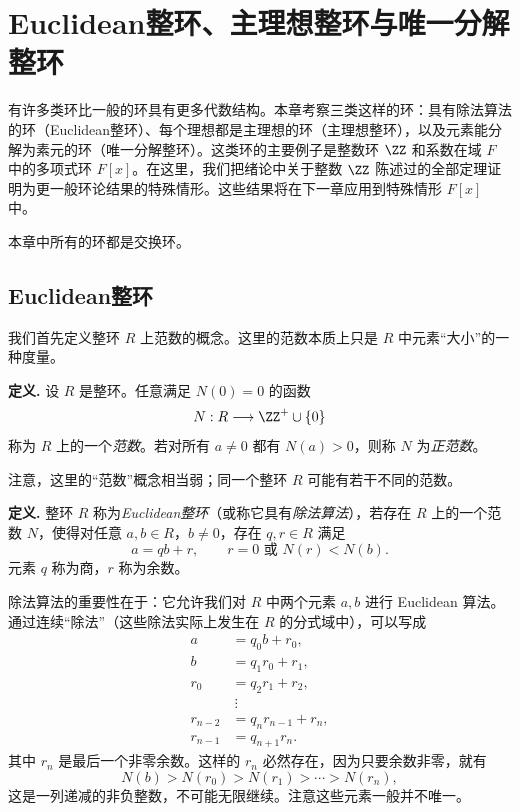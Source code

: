\chapter{Euclidean整环、主理想整环与唯一分解整环}

有许多类环比一般的环具有更多代数结构。本章考察三类这样的环：具有除法算法的环（Euclidean整环）、每个理想都是主理想的环（主理想整环），以及元素能分解为素元的环（唯一分解整环）。这类环的主要例子是整数环 $\ZZ$ 和系数在域 $F$ 中的多项式环 $F[x]$。在这里，我们把绪论中关于整数 $\ZZ$ 陈述过的全部定理证明为更一般环论结果的特殊情形。这些结果将在下一章应用到特殊情形 $F[x]$ 中。

本章中所有的环都是交换环。

\section{Euclidean整环}

我们首先定义整环 $R$ 上范数的概念。这里的范数本质上只是 $R$ 中元素“大小”的一种度量。

\noindent\textbf{定义.}
设 $R$ 是整环。任意满足 $N(0)=0$ 的函数
\[
N:R\longrightarrow \ZZ^+\cup\{0\}
\]
称为 $R$ 上的一个\emph{范数}。若对所有 $a\neq0$ 都有 $N(a)>0$，则称 $N$ 为\emph{正范数}。

注意，这里的“范数”概念相当弱；同一个整环 $R$ 可能有若干不同的范数。

\noindent\textbf{定义.}
整环 $R$ 称为\emph{Euclidean整环}（或称它具有\emph{除法算法}），若存在 $R$ 上的一个范数 $N$，使得对任意 $a,b\in R$，$b\neq0$，存在 $q,r\in R$ 满足
\[
a=qb+r,
\qquad r=0 \text{ 或 } N(r)<N(b).
\]
元素 $q$ 称为商，$r$ 称为余数。

除法算法的重要性在于：它允许我们对 $R$ 中两个元素 $a,b$ 进行 Euclidean 算法。通过连续“除法”（这些除法实际上发生在 $R$ 的分式域中），可以写成
\begin{align*}
	a&=q_0b+r_0,\tag{0}\\
	b&=q_1r_0+r_1,\tag{1}\\
	r_0&=q_2r_1+r_2,\tag{2}\\
	&\ \vdots\\
	r_{n-2}&=q_nr_{n-1}+r_n,\tag{$n$}\\
	r_{n-1}&=q_{n+1}r_n.\tag{$n+1$}
\end{align*}
其中 $r_n$ 是最后一个非零余数。这样的 $r_n$ 必然存在，因为只要余数非零，就有
\[
N(b)>N(r_0)>N(r_1)>\cdots>N(r_n),
\]
这是一列递减的非负整数，不可能无限继续。注意这些元素一般并不唯一。

